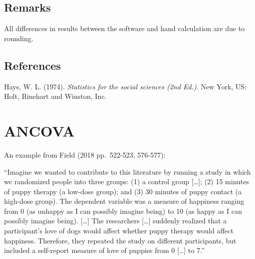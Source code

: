 \documentclass[
]{book}
\begin{document}
\hypertarget{remarks-4}{%
\subsection{Remarks}\label{remarks-4}}

All differences in results between the software and hand calculation are due to rounding.

\hypertarget{references-4}{%
\subsection{References}\label{references-4}}

Hays, W. L. (1974). \emph{Statistics for the social sciences (2nd Ed.)}. New York, US: Holt, Rinehart and Winston, Inc.

\hypertarget{ancova}{%
\section{ANCOVA}\label{ancova}}

An example from Field (2018 pp.~522-523, 576-577):

``Imagine we wanted to contribute to this literature by running a study in which we randomized people into three groups: (1) a control group {[}\ldots{]}; (2) 15 minutes of puppy therapy (a low-dose group); and (3) 30 minutes of puppy contact (a high-dose group). The dependent variable was a measure of happiness ranging from 0 (as unhappy as I can possibly imagine being) to 10 (as happy as I can possibly imagine being). {[}\ldots{]} The researchers {[}\ldots{]} suddenly realized that a participant's love of dogs would affect whether puppy therapy would affect happiness. Therefore, they repeated the study on different participants, but included a self-report measure of love of puppies from 0 {[}\ldots{]} to 7.''
\end{document}
